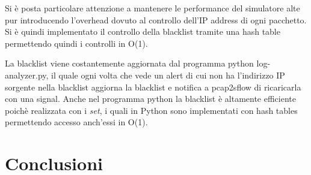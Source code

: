 \documentclass[12pt,a4paper,openright,twoside]{report}
\renewcommand{\chaptermark}[1]{\markboth{\thechapter.\ #1}{}}
\begin{document}
Si \`e posta particolare attenzione a mantenere le performance del simulatore alte pur
introducendo l'overhead dovuto al controllo dell'IP address di ogni pacchetto. Si \`e quindi
implementato il controllo della blacklist tramite una hash table permettendo quindi i
controlli in O(1).

La blacklist viene costantemente aggiornata dal programma python log-analyzer.py,
il quale ogni volta che vede un alert di cui non ha l'indirizzo IP sorgente nella
blacklist aggiorna la blacklist e notifica a pcap2sflow di ricaricarla con una signal.
Anche nel programma python la blacklist \`e altamente efficiente poich\`e realizzata con
i {\it set}, i quali in Python sono implementati con hash tables permettendo accesso anch'essi in O(1).



\clearpage{\pagestyle{empty}\cleardoublepage}
\chapter*{Conclusioni}
\renewcommand{\chaptermark}[1]{\markright{\thechapter \ #1}{}}
\lhead[\fancyplain{}{\bfseries\thepage}]{\fancyplain{}{\bfseries\rightmark}}
\appendix                               %
\end{document}
